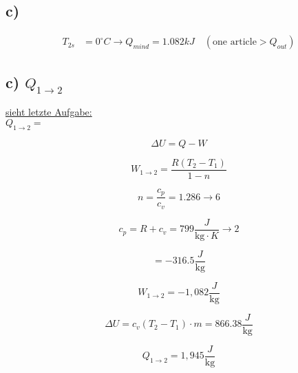 

\subsection*{c)}
\begin{align*}
    T_{2s} &= 0^\circ C \rightarrow Q_{mind} = 1.082 kJ \quad (\text{one article} > Q_{out})
\end{align*}

\subsection*{c) $Q_{1 \rightarrow 2}$}

\noindent
\underline{sieht letzte Aufgabe:} \\
$Q_{1 \rightarrow 2} = $

\[
\Delta U = Q - W
\]

\[
W_{1 \rightarrow 2} = \frac{R(T_2 - T_1)}{1 - n}
\]

\[
n = \frac{c_p}{c_v} = 1.286 \rightarrow 6
\]

\[
c_p = R + c_v = 799 \frac{J}{\text{kg} \cdot K} \rightarrow 2
\]

\[
= -316.5 \frac{J}{\text{kg}}
\]

\[
W_{1 \rightarrow 2} = -1,082 \frac{J}{\text{kg}}
\]

\[
\Delta U = c_v (T_2 - T_1) \cdot m = 866.38 \frac{J}{\text{kg}}
\]

\[
Q_{1 \rightarrow 2} = 1,945 \frac{J}{\text{kg}}
\]